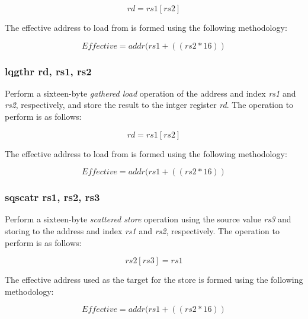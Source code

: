 \documentclass{article}
\begin{document}
\begin{equation}
rd = rs1[rs2]
\end{equation}

The effective address to load
from is formed using the following methodology:

\begin{equation}
Effective = addr(rs1 + ((rs2 * 16))
\end{equation}

\subsubsection{lqgthr rd, rs1, rs2}

Perform a sixteen-byte \emph{gathered load} operation of the address and
index \emph{rs1} and \emph{rs2}, respectively, and store the result
to the intger register \emph{rd}.
The operation to perform is as follows:

\begin{equation}
rd = rs1[rs2]
\end{equation}

The effective address to load
from is formed using the following methodology:

\begin{equation}
Effective = addr(rs1 + ((rs2 * 16))
\end{equation}

\subsubsection{sqscatr rs1, rs2, rs3}

Perform a sixteen-byte \emph{scattered store} operation using the 
source value \emph{rs3} and storing to the address and index
\emph{rs1} and \emph{rs2}, respectively.  The operation to
perform is as follows: 

\begin{equation}
rs2[rs3] = rs1
\end{equation}

The effective address used as the target
for the store is formed using the following methodology:

\begin{equation}
Effective = addr(rs1 + ((rs2 * 16))
\end{equation}


\end{document}
